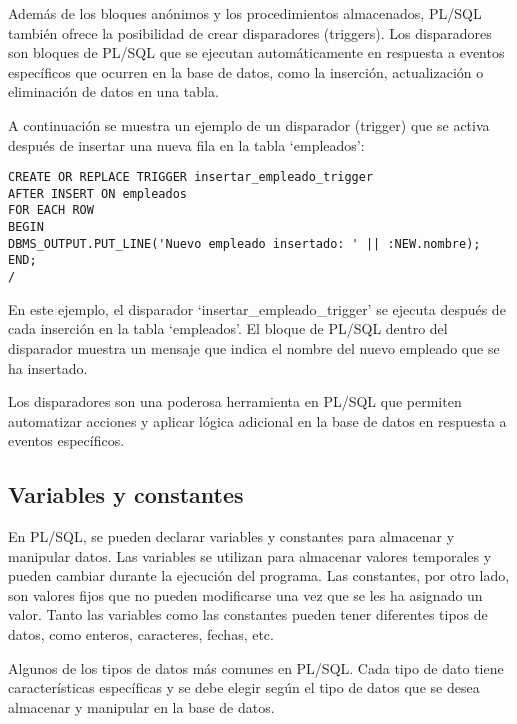 \documentclass[executivepaper]{article}
\begin{document}
Además de los bloques anónimos y los procedimientos almacenados, PL/SQL también ofrece la posibilidad de crear disparadores (triggers). Los disparadores son bloques de PL/SQL que se ejecutan automáticamente en respuesta a eventos específicos que ocurren en la base de datos, como la inserción, actualización o eliminación de datos en una tabla.

A continuación se muestra un ejemplo de un disparador (trigger) que se activa después de insertar una nueva fila en la tabla \enquote*{empleados}:

\begin{lstlisting}
CREATE OR REPLACE TRIGGER insertar_empleado_trigger
AFTER INSERT ON empleados
FOR EACH ROW
BEGIN
DBMS_OUTPUT.PUT_LINE('Nuevo empleado insertado: ' || :NEW.nombre);
END;
/
\end{lstlisting}

En este ejemplo, el disparador \enquote*{insertar\_empleado\_trigger} se ejecuta después de cada inserción en la tabla \enquote*{empleados}. El bloque de PL/SQL dentro del disparador muestra un mensaje que indica el nombre del nuevo empleado que se ha insertado.

Los disparadores son una poderosa herramienta en PL/SQL que permiten automatizar acciones y aplicar lógica adicional en la base de datos en respuesta a eventos específicos.

\subsection{Variables y constantes}
En PL/SQL, se pueden declarar variables y constantes para almacenar y manipular datos. Las variables se utilizan para almacenar valores temporales y pueden cambiar durante la ejecución del programa. Las constantes, por otro lado, son valores fijos que no pueden modificarse una vez que se les ha asignado un valor. Tanto las variables como las constantes pueden tener diferentes tipos de datos, como enteros, caracteres, fechas, etc.

Algunos de los tipos de datos más comunes en PL/SQL. Cada tipo de dato tiene características específicas y se debe elegir según el tipo de datos que se desea almacenar y manipular en la base de datos.
\end{document}
